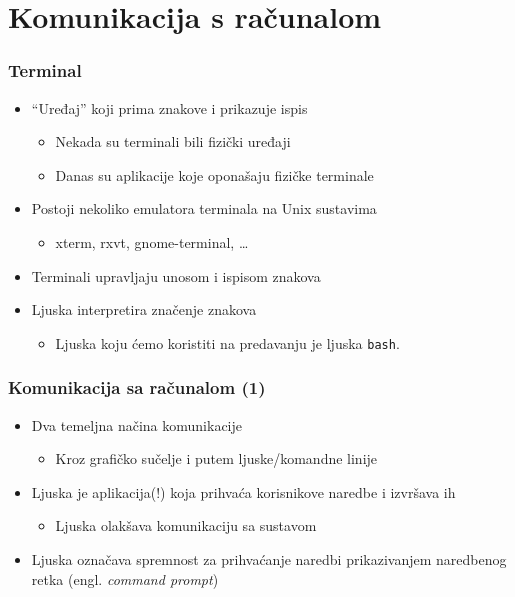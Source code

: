 \documentclass{beamer}
\begin{document}
\section{Komunikacija s računalom}
\begin{frame}[t]
\frametitle{Terminal}
\begin{itemize}
  \item ``Uređaj'' koji prima znakove i prikazuje ispis
  \begin{itemize}
    \item Nekada su terminali bili fizički uređaji
    \item Danas su aplikacije koje oponašaju fizičke terminale
  \end{itemize}
  \item Postoji nekoliko emulatora terminala na Unix sustavima
  \begin{itemize}
    \item xterm, rxvt, gnome-terminal, \ldots
  \end{itemize}
  \item Terminali upravljaju unosom i ispisom znakova
  \item Ljuska interpretira značenje znakova
  \begin{itemize}
  	\item Ljuska koju ćemo koristiti na predavanju je ljuska \texttt{bash}.
  \end{itemize}
\end{itemize}
\end{frame}

\begin{frame}[t]
\frametitle{Komunikacija sa računalom (1)}
\begin{itemize}
  \item Dva temeljna načina komunikacije
  \begin{itemize}
    \item Kroz grafičko sučelje i putem ljuske/komandne linije
  \end{itemize}
  \item Ljuska je aplikacija(!) koja prihvaća korisnikove naredbe i
        izvršava ih
  \begin{itemize}
    \item Ljuska olakšava komunikaciju sa sustavom
  \end{itemize}
  \item Ljuska označava spremnost za prihvaćanje naredbi prikazivanjem
        naredbenog retka (engl. \emph{command prompt})
\end{itemize}
\end{frame}
\end{document}
